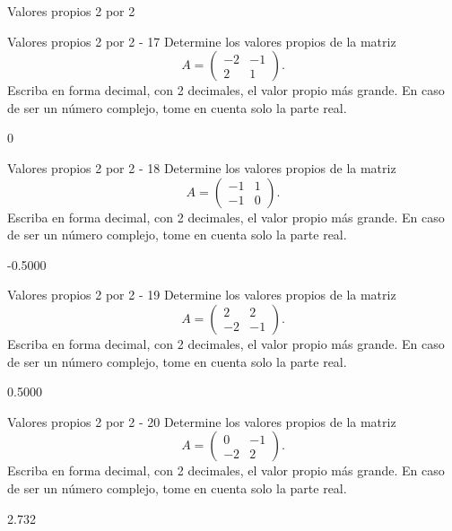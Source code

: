 \documentclass[a4,11pt]{aleph-notas}
\begin{document}
\begin{quiz}{Valores propios 2 por 2}
\begin{numerical}[tolerance=0.01]%
    {Valores propios 2 por 2 - 17}
    Determine los valores propios de la matriz
    \[
    A = \begin{pmatrix}
    -2 & -1 \\
    2 & 1
    \end{pmatrix}.
    \]
    Escriba en forma decimal, con 2 decimales, el valor propio más grande. En caso de ser un número complejo, tome en cuenta solo la parte real.
    \item[] 0
\end{numerical}

\begin{numerical}[tolerance=0.01]%
    {Valores propios 2 por 2 - 18}
    Determine los valores propios de la matriz
    \[
    A = \begin{pmatrix}
    -1 & 1 \\
    -1 & 0
    \end{pmatrix}.
    \]
    Escriba en forma decimal, con 2 decimales, el valor propio más grande. En caso de ser un número complejo, tome en cuenta solo la parte real.
    \item[] -0.5000
\end{numerical}

\begin{numerical}[tolerance=0.01]%
    {Valores propios 2 por 2 - 19}
    Determine los valores propios de la matriz
    \[
    A = \begin{pmatrix}
    2 & 2 \\
    -2 & -1
    \end{pmatrix}.
    \]
    Escriba en forma decimal, con 2 decimales, el valor propio más grande. En caso de ser un número complejo, tome en cuenta solo la parte real.
    \item[] 0.5000
\end{numerical}

\begin{numerical}[tolerance=0.01]%
    {Valores propios 2 por 2 - 20}
    Determine los valores propios de la matriz
    \[
    A = \begin{pmatrix}
    0 & -1 \\
    -2 & 2
    \end{pmatrix}.
    \]
    Escriba en forma decimal, con 2 decimales, el valor propio más grande. En caso de ser un número complejo, tome en cuenta solo la parte real.
    \item[] 2.732
\end{numerical}


\end{quiz}
\end{document}
